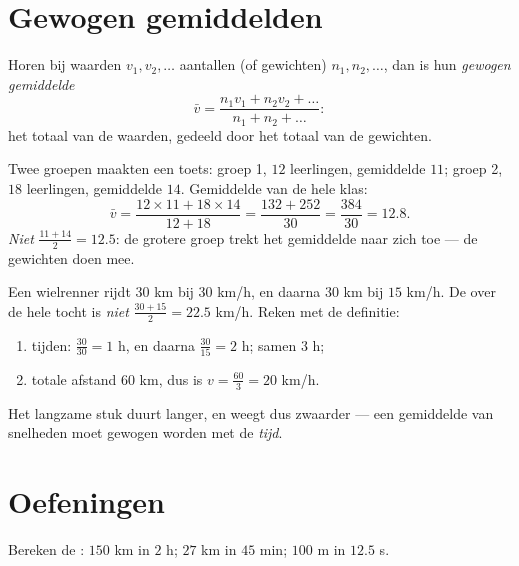 \section{Gewogen gemiddelden}

\begin{definition}\label{def:g8:speed:average}
Horen bij waarden $v_1, v_2, \dots$ aantallen (of gewichten)
$n_1, n_2, \dots$, dan is hun \emph{gewogen
gemiddelde}
\[
\bar v = \frac{n_1 v_1 + n_2 v_2 + \dots}{n_1 + n_2 + \dots} :
\]
het totaal van de waarden, gedeeld door het totaal van de gewichten.
\end{definition}

\begin{example}\label{ex:g8:speed:average}
Twee groepen maakten een toets: groep 1, $12$ leerlingen, gemiddelde $11$; groep
2, $18$ leerlingen, gemiddelde $14$. Gemiddelde van de hele klas:
\[
\bar v = \frac{12 \times 11 + 18 \times 14}{12 + 18}
= \frac{132 + 252}{30} = \frac{384}{30} = 12.8 .
\]
\emph{Niet} $\frac{11 + 14}{2} = 12.5$: de grotere groep trekt het gemiddelde
naar zich toe --- de gewichten doen mee.
\end{example}

\begin{example}\label{ex:g8:speed:twolegs}
Een wielrenner rijdt $30$ km bij $30$ km/h, en daarna $30$ km bij $15$ km/h. De
 over de hele tocht is \emph{niet}
$\frac{30 + 15}{2} = 22.5$ km/h. Reken met de definitie:
\begin{enumerate}
  \item tijden: $\frac{30}{30} = 1$ h, en daarna $\frac{30}{15} = 2$ h; samen
        $3$ h;
  \item totale afstand $60$ km, dus is $v = \frac{60}{3} = 20$ km/h.
\end{enumerate}
Het langzame stuk duurt langer, en weegt dus zwaarder --- een gemiddelde van
snelheden moet gewogen worden met de \emph{tijd}.
\end{example}

\section{Oefeningen}

\begin{exercise}[$\star$]\label{exo:g8:speed:1}
Bereken de : $150$ km in $2$ h; $27$ km in $45$ min; $100$ m
in $12.5$ s.
\end{exercise}


